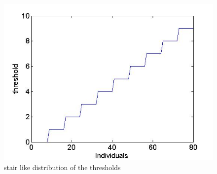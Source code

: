 \begin{figure}
\centering
\includegraphics{cascadethresholddistripution.jpg}
\caption{stair like distribution of the thresholds}
\label{cascadethreshold}
\end{figure}
